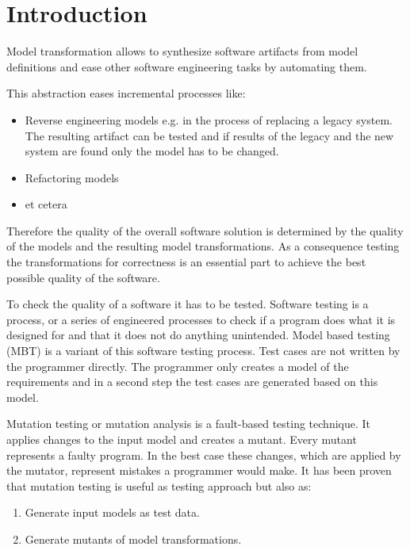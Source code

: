 \documentclass{llncs}
\begin{document}

\section{Introduction}

Model transformation allows to synthesize software artifacts from model definitions and ease other software engineering tasks by automating them.

This abstraction eases incremental processes like:\cite{Sendall:2003}
\begin{itemize}
	\item Reverse engineering models e.g. in the process of replacing a legacy system. The resulting artifact can be tested and if results of the legacy and the new system are found only the model has to be changed.
	\item Refactoring models
	\item et cetera
\end{itemize}

Therefore the quality of the overall software solution is determined by the quality of the models and the resulting model transformations.\cite{Hutchinson:2011} As a consequence testing the transformations for correctness is an essential part to achieve the best possible quality of the software.\cite{troya:2015}

To check the quality of a software it has to be tested. Software testing is a process, or a series of engineered processes  to check if a program does what it is designed for and that it does not do anything unintended.\cite{Myers:2004} Model based testing (MBT) is a variant of this software testing process. Test cases are not written by the programmer directly. The programmer only creates a model of the requirements and in a second step the test cases are generated based on this model.\cite{Utting:2012}

Mutation testing or mutation analysis is a fault-based testing technique. It
applies changes to the input model and creates a mutant. Every mutant represents a faulty
program. In the best case these changes, which are applied by the mutator, represent mistakes a programmer would make. It has been proven that mutation testing is useful as testing approach but also as:\cite{mutationssurvey:yue}

\begin{enumerate}
	\item Generate input models as test data.
	\item Generate mutants of model transformations.
\end{enumerate}
\end{document}
